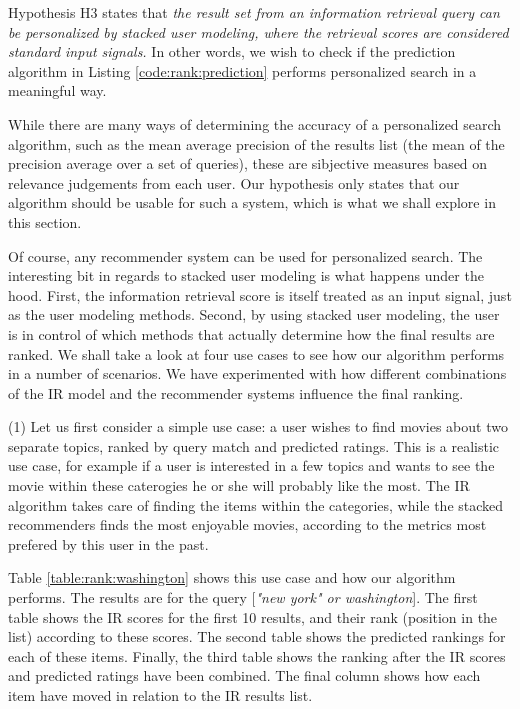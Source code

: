 Hypothesis H3 states that 
{
  \itshape
  the result set from an information retrieval query
  can be personalized by stacked user modeling, 
  where the retrieval scores are considered standard input signals.
}
In other words, we wish to check if the prediction algorithm
in Listing \ref{code:rank:prediction} performs personalized search
in a meaningful way.

While there are many ways of determining the accuracy of a personalized search
algorithm, such as the mean average precision of the results list
(the mean of the precision average over a set of queries),
these are sibjective measures based on relevance judgements from each user.
Our hypothesis only states that our algorithm should be usable for such 
a system, which is what we shall explore in this section.

Of course, any recommender system can be used for personalized search.
The interesting bit in regards to stacked user modeling is what 
happens under the hood. First, the information retrieval score 
is itself treated as an input signal, just as the user modeling methods.
Second, by using stacked user modeling, the user is in control of which
methods that actually determine how the final results are ranked.
We shall take a look at four use cases to see how our algorithm
performs in a number of scenarios. We have experimented with how
different combinations of the IR model and the recommender systems
influence the final ranking.

(1) Let us first consider a simple use case:
a user wishes to find movies about two separate topics, ranked by 
query match and predicted ratings.
This is a realistic use case, for example if a user is interested
in a few topics and wants to see the movie within these caterogies
he or she will probably like the most.
The IR algorithm takes care of finding the items within the categories,
while the stacked recommenders finds the most enjoyable movies,
according to the metrics most prefered by this user in the past.

Table \ref{table:rank:washington} shows this use case and how our algorithm performs.
The results are for the query [\emph{"new york" or washington}].
The first table shows the IR scores for the first 10 results,
and their rank (position in the list) according to these scores.
The second table shows the predicted rankings for each of these items.
Finally, the third table shows the ranking after the IR scores
and predicted ratings have been combined.
The final column shows how each item have moved in relation to the 
IR results list.

